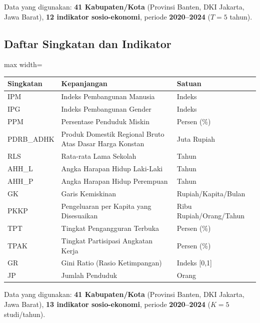 \documentclass[11pt,a4paper]{article}
\begin{document}
\noindent Data yang digunakan: \textbf{41 Kabupaten/Kota} (Provinsi Banten, DKI Jakarta, Jawa Barat), \textbf{12 indikator sosio-ekonomi}, periode \textbf{2020--2024} ($T = 5$ tahun).

\subsection*{Daftar Singkatan dan Indikator}
\begin{adjustbox}{max width=\textwidth}
\begin{tabular}{lll}
\toprule
\textbf{Singkatan} & \textbf{Kepanjangan} & \textbf{Satuan} \\
\midrule
IPM   & Indeks Pembangunan Manusia & Indeks \\
IPG   & Indeks Pembangunan Gender  & Indeks \\
PPM   & Persentase Penduduk Miskin & Persen (\%) \\
PDRB\_ADHK & Produk Domestik Regional Bruto Atas Dasar Harga Konstan & Juta Rupiah \\
RLS   & Rata-rata Lama Sekolah    & Tahun \\
AHH\_L & Angka Harapan Hidup Laki-Laki & Tahun \\
AHH\_P & Angka Harapan Hidup Perempuan & Tahun \\
GK    & Garis Kemiskinan          & Rupiah/Kapita/Bulan \\
PKKP  & Pengeluaran per Kapita yang Disesuaikan & Ribu Rupiah/Orang/Tahun \\
TPT   & Tingkat Pengangguran Terbuka & Persen (\%) \\
TPAK  & Tingkat Partisipasi Angkatan Kerja & Persen (\%) \\
GR    & Gini Ratio (Rasio Ketimpangan) & Indeks [0,1] \\
JP    & Jumlah Penduduk           & Orang \\
\bottomrule
\end{tabular}
\end{adjustbox}
\noindent Data yang digunakan: \textbf{41 Kabupaten/Kota} (Provinsi Banten, DKI Jakarta, Jawa Barat), \textbf{13 indikator sosio-ekonomi}, periode \textbf{2020--2024} ($K = 5$ studi/tahun).
\end{document}

